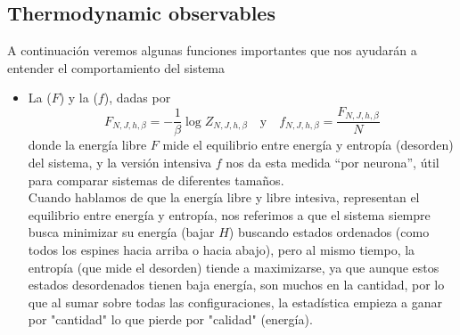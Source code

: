 \subsection{Thermodynamic observables}
A continuación veremos algunas funciones importantes que nos ayudarán a entender el comportamiento del sistema
\begin{itemize}
    \item La  ($F$) y la  ($f$), dadas por
    \begin{equation*}
        F_{N,J,h,\beta} = -\frac{1}{\beta} \log Z_{N,J,h,\beta} \quad \text{y} \quad f_{N,J,h,\beta} = \frac{F_{N,J,h,\beta}}{N}
    \end{equation*}
    donde la energía libre $F$ mide el equilibrio entre energía y entropía (desorden) del sistema, y la versión intensiva $f$ nos da esta medida ``por neurona'', útil para comparar sistemas de diferentes tamaños. \\

    \noindent
    Cuando hablamos de que la energía libre y libre intesiva, representan el equilibrio entre energía y entropía, nos referimos a que el sistema siempre busca minimizar su energía (bajar $H$) buscando estados ordenados (como todos los espines hacia arriba o hacia abajo), pero al mismo tiempo, la entropía (que mide el desorden) tiende a maximizarse, ya que aunque estos estados desordenados tienen baja energía, son muchos en la cantidad, por lo que al sumar sobre todas las configuraciones, la estadística empieza a ganar por "cantidad" lo que pierde por "calidad" (energía).


\end{itemize}
